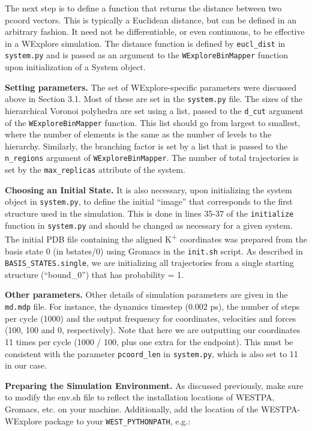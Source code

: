 \documentclass[9pt,tutorial]{livecoms}
\begin{document}
The next step is to define a function that returns the distance between two pcoord vectors. 
This is typically a Euclidean distance, but can be defined in an arbitrary fashion. 
It need not be differentiable, or even continuous, to be effective in a WExplore simulation. 
The distance function is defined by \verb|eucl_dist| in \verb|system.py| and is passed as an argument to the \verb|WExploreBinMapper| function upon initialization of a System object.

\textbf{Setting parameters.} The set of WExplore-specific parameters were discussed above in Section 3.1. 
Most of these are set in the \verb|system.py| file. The sizes of the hierarchical Voronoi polyhedra are set using a list, passed to the \verb|d_cut| argument of the \verb|WExploreBinMapper| function. 
This list should go from largest to smallest, where the number of elements is the same as the number of levels to the hierarchy. 
Similarly, the branching factor is set by a list that is passed to the \verb|n_regions| argument of \verb|WExploreBinMapper|. 
The number of total trajectories is set by the \verb|max_replicas| attribute of the system.

\textbf{Choosing an Initial State.} It is also necessary, upon initializing the system object in \verb|system.py|, to define the initial “image” that corresponds to the first structure used in the simulation. 
This is done in lines 35-37 of the \verb|initialize| function in \verb|system.py| and should be changed as necessary for a given system. 
The initial PDB file containing the aligned K\textsuperscript{+} coordinates was prepared from the basis state 0 (in bstates/0) using Gromacs in the \verb|init.sh| script. 
As described in \verb|BASIS_STATES.single|, we are initializing all trajectories from a single starting structure (“bound\_0”) that has probability = 1.

\textbf{Other parameters.} Other details of simulation parameters are given in the \verb|md.mdp| file. 
For instance, the dynamics timestep (0.002 ps), the number of steps per cycle (1000) and the output frequency for coordinates, velocities and forces (100, 100 and 0, respectively). 
Note that here we are outputting our coordinates 11 times per cycle (1000 / 100, plus one extra for the endpoint). 
This must be consistent with the parameter \verb|pcoord_len| in \verb|system.py|, which is also set to 11 in our case.

\textbf{Preparing the Simulation Environment.} As discussed previously, make sure to modify the env.sh file to reflect the installation locations of WESTPA, Gromacs, etc. on your machine. 
Additionally, add the location of the WESTPA-WExplore package to your \verb|WEST_PYTHONPATH|, e.g.:
\end{document}
